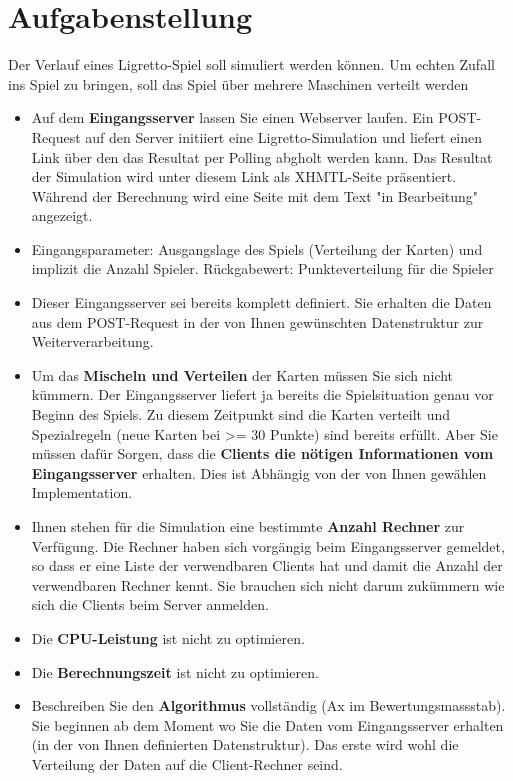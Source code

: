﻿\section{Aufgabenstellung} 

Der Verlauf eines Ligretto-Spiel soll simuliert werden können. Um echten Zufall ins Spiel zu bringen, soll das Spiel über mehrere Maschinen verteilt werden

 \begin{itemize}
 \item Auf dem \textbf{Eingangsserver} lassen Sie einen Webserver laufen. Ein POST-Request auf den Server initiiert eine Ligretto-Simulation und liefert einen Link über den das Resultat per Polling abgholt werden kann. Das Resultat der Simulation wird  unter diesem Link als XHMTL-Seite präsentiert. Während der Berechnung wird eine Seite mit dem Text "in Bearbeitung" angezeigt.
 \item Eingangsparameter: Ausgangslage des Spiels (Verteilung der Karten) und implizit die Anzahl Spieler. Rückgabewert: Punkteverteilung für die Spieler
 \item Dieser Eingangsserver sei bereits komplett definiert. Sie erhalten die Daten aus dem POST-Request in der von Ihnen gewünschten Datenstruktur zur Weiterverarbeitung.
 \item Um das \textbf{Mischeln und Verteilen} der Karten müssen Sie sich nicht kümmern. Der Eingangsserver liefert ja bereits die Spielsituation genau vor Beginn des Spiels. Zu diesem Zeitpunkt sind die Karten verteilt und Spezialregeln (neue Karten bei >= 30 Punkte) sind bereits erfüllt. Aber Sie müssen dafür Sorgen, dass die \textbf{Clients die nötigen Informationen vom Eingangsserver} erhalten. Dies ist Abhängig von der von Ihnen gewählen Implementation.
 \item Ihnen stehen für die Simulation eine bestimmte \textbf{Anzahl Rechner} zur Verfügung. Die Rechner haben sich vorgängig beim Eingangsserver gemeldet, so dass er eine Liste der verwendbaren Clients hat und damit die Anzahl der verwendbaren Rechner kennt. Sie brauchen sich nicht darum zukümmern wie sich die Clients beim Server anmelden.
 \item Die \textbf{CPU-Leistung} ist nicht zu optimieren.
 \item Die \textbf{Berechnungszeit} ist  nicht zu optimieren.
 \item Beschreiben Sie den \textbf{Algorithmus} vollständig (Ax im Bewertungsmassstab). Sie beginnen ab dem Moment wo Sie die Daten vom Eingangsserver erhalten (in der von Ihnen definierten Datenstruktur). Das erste wird wohl die Verteilung der Daten auf die Client-Rechner seind.

\end{itemize}
